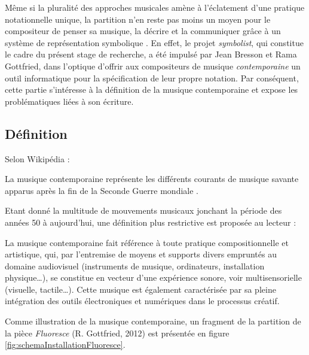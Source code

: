 Même si la pluralité des approches musicales amène à l'éclatement d'une pratique notationnelle unique, la partition n'en reste pas moins \og un moyen pour le compositeur de penser sa musique, la décrire et la communiquer grâce à un système de représentation symbolique \fg \cite{bresson2008}.
En effet, le projet \textit{symbolist}, qui constitue le cadre du présent stage de recherche, a été impulsé par Jean Bresson et Rama Gottfried, dans l'optique d'offrir aux compositeurs de musique \textit{contemporaine} un outil informatique pour la spécification de leur propre notation.
Par conséquent, cette partie s'intéresse à la définition de la musique contemporaine et expose les problématiques liées à son écriture.

\subsection{Définition}
Selon Wikipédia :

\begin{displayquote}
\og La musique contemporaine représente les différents courants de musique savante apparus après la fin de la Seconde Guerre mondiale \fg.
\end{displayquote}

Etant donné la multitude de mouvements musicaux jonchant la période des années 50 à aujourd'hui,
une définition plus restrictive est proposée au lecteur : 

\begin{displayquote}
La musique contemporaine fait référence à toute pratique compositionnelle et artistique, qui, par l'entremise de moyens et supports divers empruntés au domaine audiovisuel (instruments de musique, ordinateurs, installation physique…), se constitue en vecteur d'une expérience sonore, voir multisensorielle (visuelle, tactile…). Cette musique est également caractérisée par sa pleine intégration des outils électroniques et numériques dans le processus créatif.
\end{displayquote}

Comme illustration de la musique contemporaine, un fragment de la partition de la pièce \textit{Fluoresce} (R. Gottfried, 2012) est présentée en figure \ref{fig:schemaInstallationFluoresce}.

